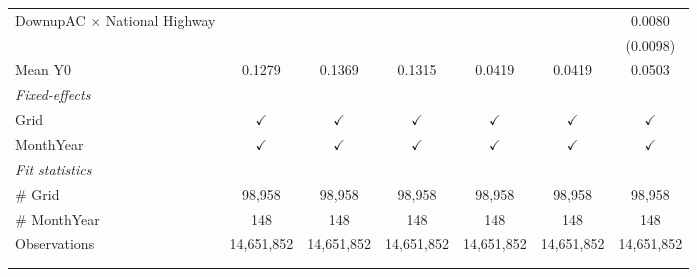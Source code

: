 \begin{table}[htbp]
\begin{tabular}{lcccccc}
      DownupAC $\times$ National Highway                         &               &               &               &               &               & 0.0080\\   
                                                                 &               &               &               &               &               & (0.0098)\\   
      \hline Mean Y0                                             & 0.1279        & 0.1369        & 0.1315        & 0.0419        & 0.0419        & 0.0503\\  
      \midrule
      \emph{Fixed-effects}\\
      Grid                                                       & $\checkmark$  & $\checkmark$  & $\checkmark$  & $\checkmark$  & $\checkmark$  & $\checkmark$\\   
      MonthYear                                                  & $\checkmark$  & $\checkmark$  & $\checkmark$  & $\checkmark$  & $\checkmark$  & $\checkmark$\\   
      \midrule
      \emph{Fit statistics}\\
      \# Grid                                                    & 98,958        & 98,958        & 98,958        & 98,958        & 98,958        & 98,958\\  
      \# MonthYear                                               & 148           & 148           & 148           & 148           & 148           & 148\\  
      Observations                                               & 14,651,852    & 14,651,852    & 14,651,852    & 14,651,852    & 14,651,852    & 14,651,852\\  
      \midrule \midrule
                                                                 &               &               &               &               &               &  \tabularnewline 
      \\
   \end{tabular}
\end{table}


